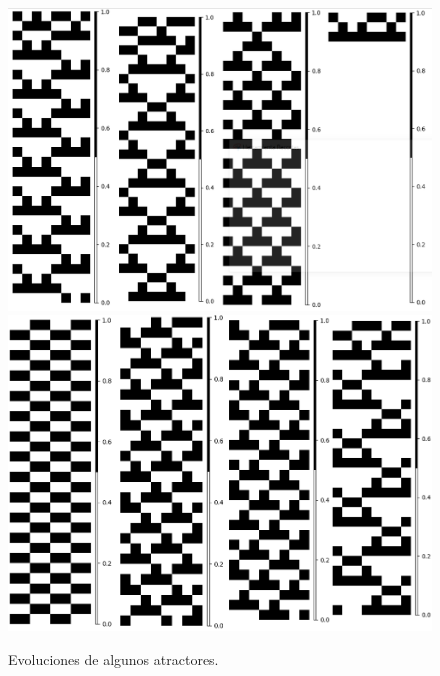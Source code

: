 \documentclass[11pt]{article}
\begin{document}
			\begin{figure}[H]
			\centering
			\includegraphics[scale=0.3]{resources/Atractores54/atractor_54_size_8_res.png}
			\includegraphics[scale=0.3]{resources/Atractores54/atractor_54_size_8_res1.png}
			\caption{Evoluciones de algunos atractores.}\label{fig:picture}
			\end{figure}	
\end{document}
